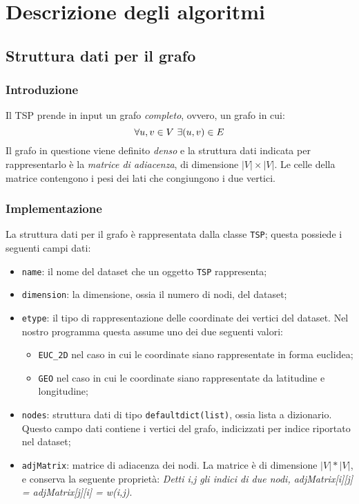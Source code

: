 \section{Descrizione degli algoritmi}

\subsection{Struttura dati per il grafo}

\subsubsection{Introduzione}

Il TSP prende in input un grafo \textit{completo}, ovvero, un grafo in cui:
\[
    \forall u, v \in V \textnormal{ } \exists (u, v) \in E
\]
Il grafo in questione viene definito \textit{denso} e la struttura dati indicata per rappresentarlo è
la \textit{matrice di adiacenza}, di dimensione $|V| \times |V|$. Le celle della matrice contengono
i pesi dei lati che congiungono i due vertici.

\subsubsection{Implementazione}

La struttura dati per il grafo è rappresentata dalla classe \texttt{TSP}; questa possiede i seguenti campi dati:
\begin{itemize}
    \item \texttt{name}: il nome del dataset che un oggetto \texttt{TSP} rappresenta;
    \item \texttt{dimension}: la dimensione, ossia il numero di nodi, del dataset;
    \item \texttt{etype}: il tipo di rappresentazione delle coordinate dei vertici del dataset. Nel nostro programma questa assume uno dei due seguenti valori: \begin{itemize}
        \item \texttt{EUC\_2D} nel caso in cui le coordinate siano rappresentate in forma euclidea;
        \item \texttt{GEO} nel caso in cui le coordinate siano rappresentate da latitudine e longitudine;
    \end{itemize}
    \item \texttt{nodes}: struttura dati di tipo \texttt{defaultdict(list)}, ossia lista a dizionario. Questo campo dati contiene i vertici del grafo, indicizzati per indice riportato nel dataset;
    \item \texttt{adjMatrix}: matrice di adiacenza dei nodi. La matrice è di dimensione $|V|*|V|$, e conserva la seguente proprietà: \textit{Detti i,j gli indici di due nodi, adjMatrix[i][j] = adjMatrix[j][i] = w(i,j)}.
\end{itemize}

